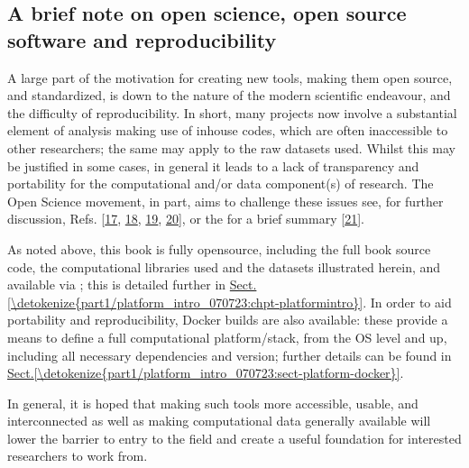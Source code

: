 \documentclass[letterpaper,table,10pt,english]{jupyterBook}
\begin{document}
\subsection{A brief note on open science, open source software and reproducibility}
\label{\detokenize{part1/main_intro_060723:a-brief-note-on-open-science-open-source-software-and-reproducibility}}\label{\detokenize{part1/main_intro_060723:sect-intro-open-science}}
\sphinxAtStartPar
A large part of the motivation for creating new tools, making them open source, and standardized, is down to the nature of the modern scientific endeavour, and the difficulty of reproducibility. In short, many projects now involve a substantial element of analysis making use of in\sphinxhyphen{}house codes, which are often inaccessible to other researchers; the same may apply to the raw datasets used. Whilst this may be justified in some cases, in general it leads to a lack of transparency and portability for the computational and/or data component(s) of research. The Open Science movement, in part, aims to challenge these issues \sphinxhyphen{} see, for further discussion, Refs. {[}\hyperlink{cite.backmatter/bibliography:id509}{17}, \hyperlink{cite.backmatter/bibliography:id768}{18}, \hyperlink{cite.backmatter/bibliography:id789}{19}, \hyperlink{cite.backmatter/bibliography:id885}{20}{]}, or the  for a brief summary {[}\hyperlink{cite.backmatter/bibliography:id940}{21}{]}.

\sphinxAtStartPar
As noted above, this book is fully open\sphinxhyphen{}source, including the full book source code, the computational libraries used and the datasets illustrated herein, and available via ; this is detailed further in \hyperref[\detokenize{part1/platform_intro_070723:chpt-platformintro}]{Sect.\@ \ref{\detokenize{part1/platform_intro_070723:chpt-platformintro}}}. In order to aid portability and reproducibility, Docker builds are also available: these provide a means to define a full computational platform/stack, from the OS level and up, including all necessary dependencies and version; further details can be found in \hyperref[\detokenize{part1/platform_intro_070723:sect-platform-docker}]{Sect.\@ \ref{\detokenize{part1/platform_intro_070723:sect-platform-docker}}}.

\sphinxAtStartPar
In general, it is hoped that making such tools more accessible, usable, and interconnected \sphinxhyphen{} as well as making computational data generally available \sphinxhyphen{} will lower the barrier to entry to the field and create a useful foundation for interested researchers to work from.
\end{document}
